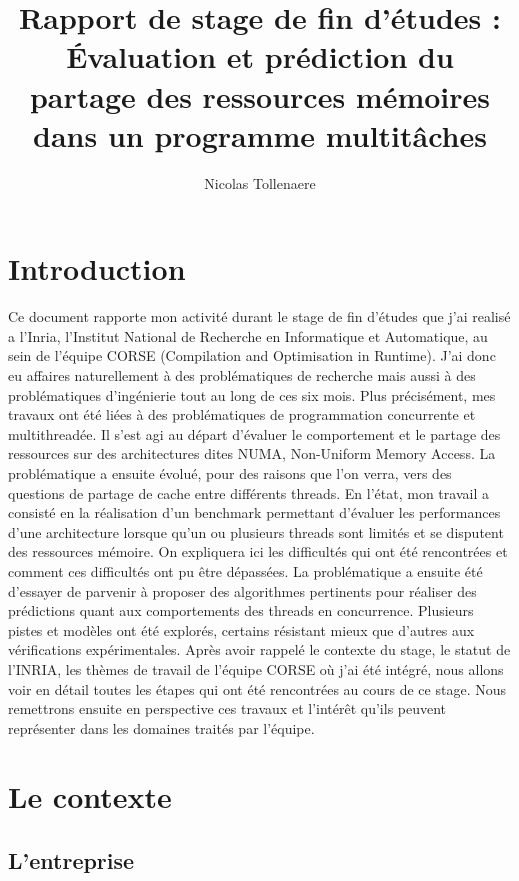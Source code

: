 \documentclass{report}
\author{Nicolas Tollenaere}
\title{Rapport de stage de fin d'études : Évaluation et prédiction du partage des ressources mémoires
dans un programme multitâches}
\begin{document}
\maketitle
\tableofcontents




\chapter{Introduction}
Ce document rapporte mon activité durant le stage de fin d'études que j'ai 
realisé a l'Inria, l'Institut National de Recherche en Informatique et
Automatique, au sein de l'équipe CORSE (Compilation and Optimisation in Runtime).
J'ai donc eu affaires naturellement à des problématiques de recherche mais aussi à
des problématiques d'ingénierie tout au long de ces six mois. Plus précisément, mes travaux ont été
liées à des problématiques de programmation concurrente et multithreadée. Il s'est agi au départ d'évaluer
le comportement et le partage des ressources sur des architectures dites NUMA, Non-Uniform Memory Access. 
La problématique a ensuite évolué, pour des raisons que l'on verra, vers des questions de partage de cache
entre différents threads.
En l'état, mon travail a consisté en la réalisation d'un benchmark permettant d'évaluer les performances
d'une architecture lorsque qu'un ou plusieurs threads sont limités et se disputent des ressources mémoire.
On expliquera ici les difficultés qui ont été rencontrées et comment ces difficultés ont pu être dépassées.
La problématique a ensuite été d'essayer de parvenir à proposer des algorithmes pertinents pour réaliser 
des prédictions quant aux comportements des threads en concurrence. 
Plusieurs pistes et modèles ont été explorés, certains résistant mieux que d'autres aux vérifications 
expérimentales.
Après avoir rappelé le contexte du stage, le statut de l'INRIA, les thèmes de travail de l'équipe CORSE où
j'ai été intégré, nous allons voir en détail toutes les étapes qui ont été rencontrées au cours de ce stage. 
Nous remettrons ensuite en perspective ces travaux et l'intérêt qu'ils peuvent représenter dans les 
domaines traités par l'équipe.

\chapter{Le contexte}
\section{L'entreprise}
\end{document}
